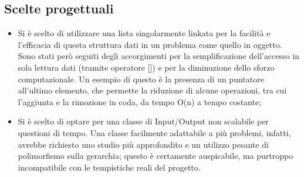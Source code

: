 \subsection{Scelte progettuali}
\begin{itemize}
\item Si è scelto di utilizzare una lista singolarmente linkata per la facilità e l'efficacia di questa struttura dati in un problema come quello in oggetto. Sono stati però seguiti degli accorgimenti per la semplificazione dell'accesso in sola lettura dati (tramite operatore []) e per la diminuzione dello sforzo computazionale. Un esempio di questo è la presenza di un puntatore all'ultimo elemento, che permette la riduzione di alcune operazioni, tra cui l'aggiunta e la rimozione in coda, da tempo O(n) a tempo costante;
\item Si è scelto di optare per una classe di Input/Output non scalabile per questioni di tempo. Una classe facilmente adattabile a più problemi, infatti, avrebbe richiesto uno studio più approfondito e un utilizzo pesante di polimorfismo sulla gerarchia; questo è certamente auspicabile, ma purtroppo incompatibile con le tempistiche reali del progetto.
\end{itemize}
